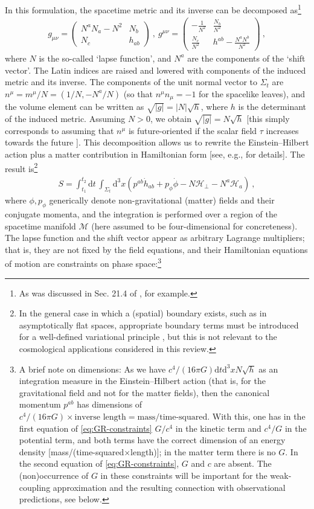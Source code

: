 \documentclass[12pt]{iopart}
\def\eq#1{\begin{equation}\begin{aligned}#1\end{aligned}\end{equation}}
\def\D{\mathrm{d}}
\begin{document}
In this formulation, the spacetime metric and its inverse can be decomposed as\footnote{As was discussed in Sec. 21.4 of \citet{Misner:1973prb}, for example.}
\eq{\label{eq:3p1-decomp}
g_{\mu\nu} = \left(\begin{matrix}
N^aN_a-N^2 & N_b\\
N_c & h_{ab}
\end{matrix}\right) \ , \ g^{\mu\nu} =  \left(\begin{matrix}
-\frac{1}{N^2} & \frac{N_b}{N^2}\\
\frac{N_c}{N^2} & h^{ab}-\frac{N^aN^b}{N^2}
\end{matrix}\right) \ ,
}
where $N$ is the so-called `lapse function', and $N^a$ are the components of the `shift vector'. The Latin indices are raised and lowered with components of the induced metric and its inverse. The components of the unit normal vector to $\Sigma_t$ are $n^{\mu} = m^{\mu}/N  = (1/N, -N^a/N)$ (so that $n^{\mu}n_{\mu}=-1$ for the spacelike leaves), and the volume element can be written as $\sqrt{|g|} = |N|\sqrt{h}$, where $h$ is the determinant of the induced metric. Assuming $N>0$, we obtain $\sqrt{|g|}=N\sqrt{h}$ [this simply corresponds to assuming that $n^{\mu}$ is future-oriented if the scalar field $\tau$ increases towards the future \citep{Gourgoulhon}]. This decomposition allows us to rewrite the Einstein--Hilbert action plus a matter contribution in Hamiltonian form [see, e.g., \citet{Kiefer:book} for details]. The result is\footnote{In the general case in which a (spatial) boundary exists, such as in asymptotically flat spaces, appropriate boundary terms must be introduced for a well-defined variational principle 
\citep{Regge:1974zd,Beig:1987zz}, but this is not relevant to the cosmological applications considered in this review.}
\eq{\label{eq:GR-action}
S = \int_{t_1}^{t_2}\D t\,\int_{\Sigma_t}\D^3 x \left(p^{ab}\dot{h}_{ab}+p_{\phi}\dot{\phi}-N\mathcal{H}_{\perp}-N^a\mathcal{H}_a\right) \ ,
}
where $\phi,p_{\phi}$ generically denote non-gravitational (matter) fields and their conjugate momenta, and the integration is performed over a region of the spacetime manifold $\mathcal{M}$ (here assumed to be four-dimensional for concreteness). The lapse function and the shift vector appear as arbitrary Lagrange multipliers; that is, they are not fixed by the field equations, and their Hamiltonian equations of motion are constraints on phase space:\footnote{A brief note on dimensions: As we have $c^4/(16\pi G)\D t\D^3x N\sqrt{h}$ as an integration measure in the Einstein--Hilbert action (that is, for the gravitational field and not for the matter fields), then the canonical momentum $p^{ab}$ has dimensions of $c^4/(16\pi G)\times\text{inverse length}=\text{mass}/\text{time-squared}$. With this, one has in the first equation of \eqref{eq:GR-constraints} $G/c^4$ in the kinetic term and $c^4/G$ in the potential term, and both terms have the correct dimension of an energy density [mass/(time-squared$\times$length)]; in the matter term there is no $G$. In the second equation of \eqref{eq:GR-constraints}, $G$ and $c$ are absent. The (non)occurrence of $G$ in these constraints will be important for the weak-coupling approximation and the resulting connection with observational predictions, see below.} 
\end{document}
